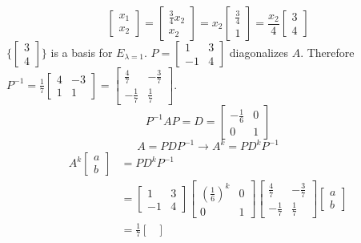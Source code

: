 \documentclass[12pt]{article}
\begin{document}
\begin{example}
$$\begin{bmatrix} x_1 \\ x_2 \end{bmatrix} = \begin{bmatrix} \frac{3}{4}x_2 \\ x_2 \end{bmatrix} = x_2\begin{bmatrix} \frac{3}{4} \\ 1 \end{bmatrix} = \frac{x_2}{4}\begin{bmatrix} 3 \\ 4 \end{bmatrix}$$ $\{\begin{bmatrix} 3 \\ 4 \end{bmatrix}\}$ is a basis for $E_{\lambda = 1}$. \newline $P = \begin{bmatrix} 1 & 3 \\ -1 & 4 \end{bmatrix}$ diagonalizes $A$. Therefore $P^{-1} = \frac{1}{7}\begin{bmatrix} 4 & -3 \\ 1 & 1 \end{bmatrix} = \begin{bmatrix} \frac{4}{7} & -\frac{3}{7} \\ -\frac{1}{7} & \frac{1}{7} \end{bmatrix}$. 
$$P^{-1}AP = D = \begin{bmatrix} -\frac{1}{6} & 0 \\ 0 & 1 \end{bmatrix} $$ $$ A = PDP^{-1} \rightarrow A^k = PD^kP^{-1} $$ 
$$\begin{aligned} A^k\begin{bmatrix} a \\ b \end{bmatrix} &= PD^kP^{-1} \\ &= \begin{bmatrix} 1 & 3 \\ -1 & 4 \end{bmatrix}\begin{bmatrix} (\frac{1}{6})^k & 0 \\ 0 & 1 \end{bmatrix}\begin{bmatrix} \frac{4}{7} & -\frac{3}{7} \\ -\frac{1}{7} & \frac{1}{7} \end{bmatrix}\begin{bmatrix} a \\ b \end{bmatrix} \\ &= \frac{1}{7}\begin{bmatrix} 

\end{bmatrix}
\end{aligned}$$
\end{example}
\end{document}

